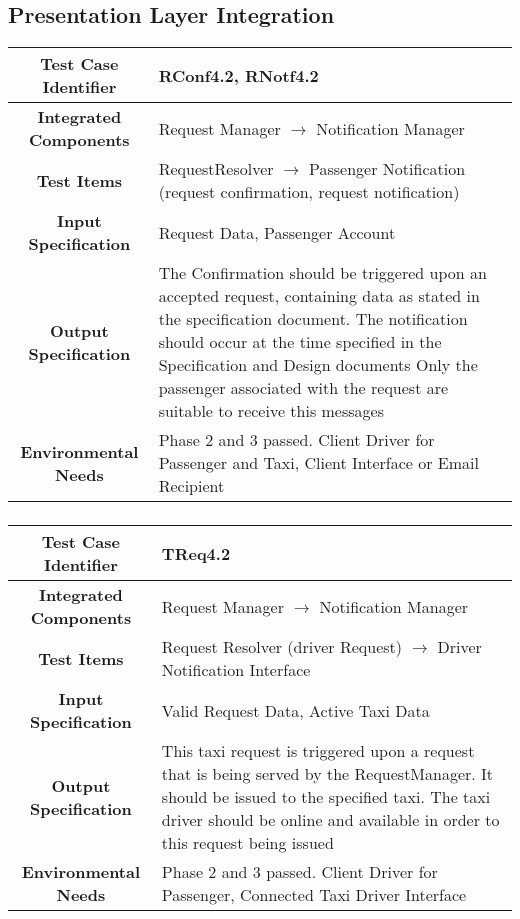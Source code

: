 \documentclass[11pt, a4paper,titlepage]{article}
\begin{document}
	\subsection{Presentation Layer Integration}
			\begin{tabularx}{\textwidth}{| c|X|}
				\hline \textbf{Test Case Identifier} & \label{RConf4.2}RConf4.2, \label{RNotf4.2}RNotf4.2 \\
				\hline \textbf{Integrated Components} & Request Manager $\rightarrow $ Notification Manager \\
				\hline \textbf{Test Items} & RequestResolver $\rightarrow $ Passenger Notification (request confirmation, request notification) \\
				\hline \textbf{Input Specification} & Request Data, Passenger Account \\
				\hline \textbf{Output Specification} & The Confirmation should be triggered upon an accepted request, containing data as stated in the specification document. \newline
				The notification should occur at the time specified in the Specification and Design documents \newline
				Only the passenger associated with the request are suitable to receive this messages 
				\\
				\hline \textbf{Environmental Needs} & Phase 2 and 3 passed. Client Driver for Passenger and Taxi, Client Interface or Email Recipient \\
				\hline
			\end{tabularx}
			\newline
			\subsubsection{}
			\begin{tabularx}{\textwidth}{| c|X|}
				\hline \textbf{Test Case Identifier} & \label{TReq4.2}TReq4.2 \\
				\hline \textbf{Integrated Components} &  Request Manager $\rightarrow $ Notification Manager \\
				\hline \textbf{Test Items} & Request Resolver (driver Request) $\rightarrow $ Driver Notification Interface \\
				\hline \textbf{Input Specification} & Valid Request Data, Active Taxi Data \\
				\hline \textbf{Output Specification} & This taxi request is triggered upon a request that is being served by the RequestManager. It should be issued to the specified taxi. \newline
				The taxi driver should be online and available in order to this request being issued \\
				\hline \textbf{Environmental Needs} & Phase 2 and 3 passed. Client Driver for Passenger, Connected Taxi Driver Interface \\
				\hline
			\end{tabularx}
			\newline
\end{document}
